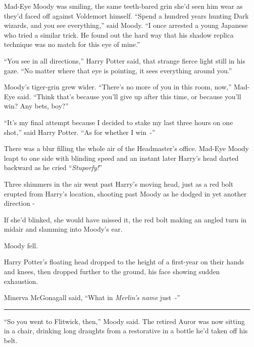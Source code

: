 Mad-Eye Moody was smiling, the same teeth-bared grin she'd seen him wear as they'd faced off against Voldemort himself. ``Spend a hundred years hunting Dark wizards, and you see everything,'' said Moody. ``I once arrested a young Japanese who tried a similar trick. He found out the hard way that his shadow replica technique was no match for this eye of mine.''

``You see in all directions,'' Harry Potter said, that strange fierce light still in his gaze. ``No matter where that eye is pointing, it sees everything around you.''

Moody's tiger-grin grew wider. ``There's no more of you in this room, now,'' Mad-Eye said. ``Think that's because you'll give up after this time, or because you'll win? Any bets, boy?''

``It's my final attempt because I decided to stake my last three hours on one shot,'' said Harry Potter. ``As for whether I win~-''

There was a blur filling the whole air of the Headmaster's office. Mad-Eye Moody leapt to one side with blinding speed and an instant later Harry's head darted backward as he cried ``\emph{Stuporfy!}''

Three shimmers in the air went past Harry's moving head, just as a red bolt erupted from Harry's location, shooting past Moody as he dodged in yet another direction -

If she'd blinked, she would have missed it, the red bolt making an angled turn in midair and slamming into Moody's ear.

Moody fell.

Harry Potter's floating head dropped to the height of a first-year on their hands and knees, then dropped further to the ground, his face showing sudden exhaustion.

Minerva McGonagall said, ``What in \emph{Merlin's name} just~-''

\begin{center}\rule{3in}{0.4pt}\end{center}

``So you went to Flitwick, then,'' Moody said. The retired Auror was now sitting in a chair, drinking long draughts from a restorative in a bottle he'd taken off his belt.

